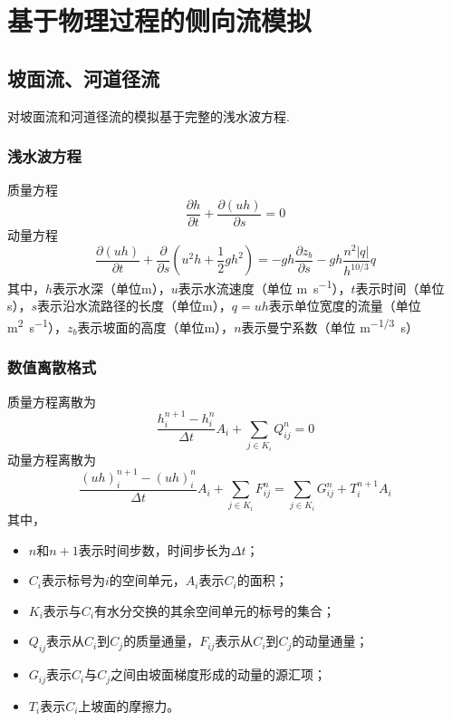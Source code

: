 \chapter{基于物理过程的侧向流模拟}

\section{坡面流、河道径流}
对坡面流和河道径流的模拟基于完整的浅水波方程.
 \subsection{浅水波方程}
 质量方程
  \begin{equation}
 \frac{\partial h}{\partial t} + \frac{\partial \left(uh\right)}{\partial s} = 0
 \end{equation}
 动量方程
 \begin{equation}
 \frac{\partial \left(uh\right)}{\partial t} + \frac{\partial}{\partial s}\left(u^2h+\frac{1}{2}gh^2\right) = -gh\frac{\partial z_b}{\partial s}-gh\frac{n^2\left|q\right|}{h^{10/3}}q
  \end{equation}
  其中，$h$表示水深（单位m），$u$表示水流速度（单位 \unit{m.s^{-1}}），$t$表示时间（单位s），$s$表示沿水流路径的长度（单位m），$q=uh$表示单位宽度的流量（单位 \unit{m^2.s^{-1}}），$z_b$表示坡面的高度（单位m），$n$表示曼宁系数（单位 \unit{m^{-1/3}.s}）


\subsection{数值离散格式}

 质量方程离散为
  \begin{equation}
 \frac{ h^{n+1}_i - h^n_i}{\Delta t} A_i+\sum_{j\in K_i} Q^n_{ij} = 0
 \end{equation}
 动量方程离散为
 \begin{equation}
 \frac{ \left(uh\right)^{n+1}_i - \left(uh\right)^n_i}{\Delta t} A_i + \sum_{j\in K_i} F^n_{ij} = \sum_{j\in K_i} G^n_{ij}  + T^{n+1}_i  A_i \label{swe-d-2}
  \end{equation}
其中，
\begin{itemize}
\item $n$和$n+1$表示时间步数，时间步长为$\Delta t$；
\item $C_i$表示标号为$i$的空间单元，$A_i$表示$C_i$的面积；
\item $K_i$表示与$C_i$有水分交换的其余空间单元的标号的集合；
\item $Q_{ij}$表示从$C_i$到$C_j$的质量通量，$F_{ij}$表示从$C_i$到$C_j$的动量通量；
\item $G_{ij}$表示$C_i$与$C_j$之间由坡面梯度形成的动量的源汇项；
\item $T_i$表示$C_i$上坡面的摩擦力。
\end{itemize}

